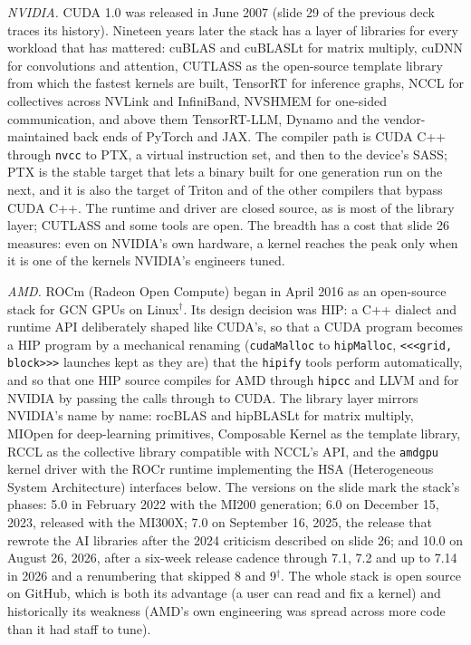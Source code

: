 \documentclass[11pt,letterpaper]{article}
\begin{document}
\emph{NVIDIA.} CUDA 1.0 was released in June 2007 (slide 29 of the previous deck traces its history). Nineteen years later the stack has a layer of libraries for every workload that has mattered: cuBLAS and cuBLASLt for matrix multiply, cuDNN for convolutions and attention, CUTLASS as the open-source template library from which the fastest kernels are built, TensorRT for inference graphs, NCCL for collectives across NVLink and InfiniBand, NVSHMEM for one-sided communication, and above them TensorRT-LLM, Dynamo and the vendor-maintained back ends of PyTorch and JAX. The compiler path is CUDA C++ through \texttt{nvcc} to PTX, a virtual instruction set, and then to the device's SASS; PTX is the stable target that lets a binary built for one generation run on the next, and it is also the target of Triton and of the other compilers that bypass CUDA C++. The runtime and driver are closed source, as is most of the library layer; CUTLASS and some tools are open. The breadth has a cost that slide 26 measures: even on NVIDIA's own hardware, a kernel reaches the peak only when it is one of the kernels NVIDIA's engineers tuned.

\emph{AMD.} ROCm (Radeon Open Compute) began in April 2016 as an open-source stack for GCN GPUs on Linux$^\dagger$. Its design decision was HIP: a C++ dialect and runtime API deliberately shaped like CUDA's, so that a CUDA program becomes a HIP program by a mechanical renaming (\texttt{cudaMalloc} to \texttt{hipMalloc}, \texttt{<<<grid, block>>>} launches kept as they are) that the \texttt{hipify} tools perform automatically, and so that one HIP source compiles for AMD through \texttt{hipcc} and LLVM and for NVIDIA by passing the calls through to CUDA. The library layer mirrors NVIDIA's name by name: rocBLAS and hipBLASLt for matrix multiply, MIOpen for deep-learning primitives, Composable Kernel as the template library, RCCL as the collective library compatible with NCCL's API, and the \texttt{amdgpu} kernel driver with the ROCr runtime implementing the HSA (Heterogeneous System Architecture) interfaces below. The versions on the slide mark the stack's phases: 5.0 in February 2022 with the MI200 generation; 6.0 on December 15, 2023, released with the MI300X; 7.0 on September 16, 2025, the release that rewrote the AI libraries after the 2024 criticism described on slide 26; and 10.0 on August 26, 2026, after a six-week release cadence through 7.1, 7.2 and up to 7.14 in 2026 and a renumbering that skipped 8 and 9$^\dagger$. The whole stack is open source on GitHub, which is both its advantage (a user can read and fix a kernel) and historically its weakness (AMD's own engineering was spread across more code than it had staff to tune).
\end{document}
